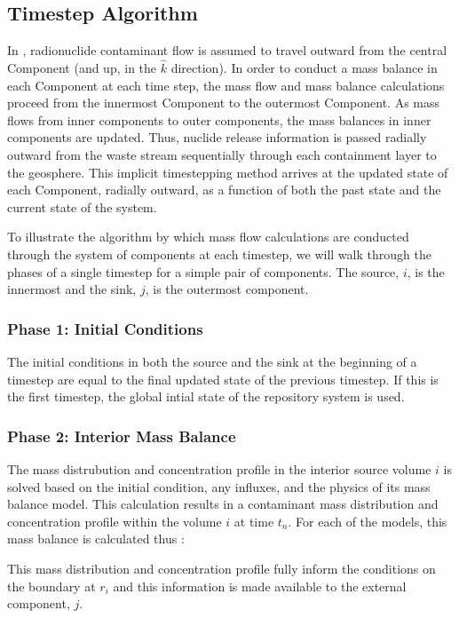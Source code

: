 \subsection{Timestep Algorithm}\label{sec:timestepping}

In \Cyder, radionuclide contaminant flow is assumed to travel outward from 
the central Component (and up, in the $\hat{k}$ direction). In order to conduct 
a mass balance in each Component at each time step, the mass flow and mass 
balance calculations proceed from the innermost Component to the outermost 
Component. As mass flows from inner components to outer components, the mass 
balances in inner components are updated.  Thus, nuclide release information is 
passed radially outward from the waste stream sequentially through each 
containment layer to the geosphere.  This implicit timestepping method 
arrives at the updated state of each Component, radially outward, as a function 
of both the past state and the current state of the system. 

To illustrate the algorithm by which mass flow calculations are conducted 
through the system of components at each timestep, we will walk through the 
phases of a single timestep for a simple pair of components. The source, $i$, 
is the innermost and the sink, $j$, is the outermost component. 

\subsubsection{Phase 1: Initial Conditions}

The initial conditions in both the source and the sink at the beginning of a 
timestep are equal to the final updated state of the previous timestep. If this 
is the first timestep, the global intial state of the repository system is used. 

\subsubsection{Phase 2: Interior Mass Balance}

The mass distrubution and concentration profile in the interior source volume 
$i$ is solved based on the initial condition, any influxes, and the physics of 
its mass balance model.  This calculation results in a contaminant mass 
distribution and concentration profile within the volume $i$ at time $t_n$.  
For each of the models, this mass balance is calculated thus :

This mass distribution and concentration profile fully inform 
the conditions on the boundary at $r_i$ and this information is made available 
to the external component, $j$.


